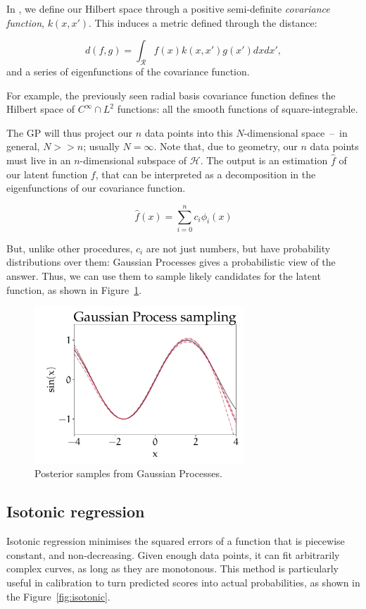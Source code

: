 In \GP, we define our Hilbert space through a positive semi-definite \emph{covariance function}, $k(x, x')$.
This induces a metric defined through the distance:

	\[	d(f, g) =\int_{\mathcal{R}}  f(x) k(x, x') g(x') dx dx', \]
and a series of eigenfunctions of the covariance function.
	
For example, the previously seen radial basis covariance function defines the Hilbert space of $C^\infty \cap L^2$ functions: all the smooth functions of square-integrable.
	
The GP will thus project our $n$ data points into this $N$-dimensional space~--~in general, $N >> n$; usually $N = \infty$. Note that, due to geometry, our $n$ data points must live in an $n$-dimensional subspace of $\mathscr{H}$.
The output is an estimation $\hat f$ of our latent function $f$, that can be interpreted as a decomposition in the eigenfunctions of our covariance function.
	
	\[\hat f(x) = \sum_{i=0}^{n} c_i \phi_i(x)\]
	
But, unlike other procedures, $c_i$ are not just numbers, but have probability distributions over them:
Gaussian Processes gives a probabilistic view of the answer.
Thus, we can use them to sample likely candidates for the latent function, as shown in Figure~\ref{fig:gp_sampling}.
	
\begin{figure}[hbt]
\centering
	\includegraphics[width=0.7\textwidth]{machine_learning/figures/sin_samples}
	\caption{Posterior samples from Gaussian Processes.}\label{fig:gp_sampling}
\end{figure}

\subsection{Isotonic regression}
Isotonic regression minimises the squared errors of a function that is piecewise constant, and non-decreasing.
Given enough data points, it can fit arbitrarily complex curves, as long as they are monotonous.
This method is particularly useful in calibration to turn predicted scores into actual probabilities, as shown in the Figure~\ref{fig:isotonic}.

